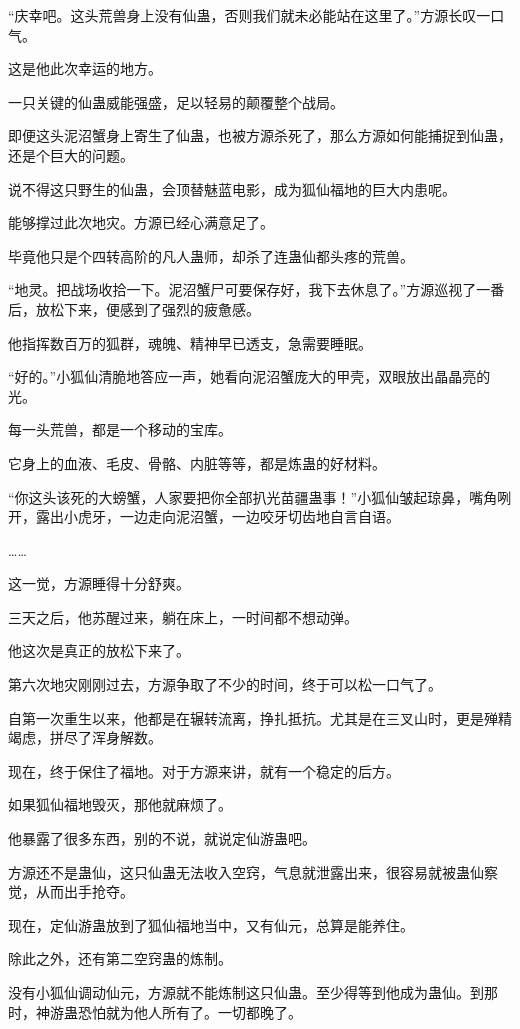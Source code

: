 \begin{this_body}
“庆幸吧。这头荒兽身上没有仙蛊，否则我们就未必能站在这里了。”方源长叹一口气。

这是他此次幸运的地方。

一只关键的仙蛊威能强盛，足以轻易的颠覆整个战局。

即便这头泥沼蟹身上寄生了仙蛊，也被方源杀死了，那么方源如何能捕捉到仙蛊，还是个巨大的问题。

说不得这只野生的仙蛊，会顶替魅蓝电影，成为狐仙福地的巨大内患呢。

能够撑过此次地灾。方源已经心满意足了。

毕竟他只是个四转高阶的凡人蛊师，却杀了连蛊仙都头疼的荒兽。

“地灵。把战场收拾一下。泥沼蟹尸可要保存好，我下去休息了。”方源巡视了一番后，放松下来，便感到了强烈的疲惫感。

他指挥数百万的狐群，魂魄、精神早已透支，急需要睡眠。

“好的。”小狐仙清脆地答应一声，她看向泥沼蟹庞大的甲壳，双眼放出晶晶亮的光。

每一头荒兽，都是一个移动的宝库。

它身上的血液、毛皮、骨骼、内脏等等，都是炼蛊的好材料。

“你这头该死的大螃蟹，人家要把你全部扒光苗疆蛊事！”小狐仙皱起琼鼻，嘴角咧开，露出小虎牙，一边走向泥沼蟹，一边咬牙切齿地自言自语。

……

这一觉，方源睡得十分舒爽。

三天之后，他苏醒过来，躺在床上，一时间都不想动弹。

他这次是真正的放松下来了。

第六次地灾刚刚过去，方源争取了不少的时间，终于可以松一口气了。

自第一次重生以来，他都是在辗转流离，挣扎抵抗。尤其是在三叉山时，更是殚精竭虑，拼尽了浑身解数。

现在，终于保住了福地。对于方源来讲，就有一个稳定的后方。

如果狐仙福地毁灭，那他就麻烦了。

他暴露了很多东西，别的不说，就说定仙游蛊吧。

方源还不是蛊仙，这只仙蛊无法收入空窍，气息就泄露出来，很容易就被蛊仙察觉，从而出手抢夺。

现在，定仙游蛊放到了狐仙福地当中，又有仙元，总算是能养住。

除此之外，还有第二空窍蛊的炼制。

没有小狐仙调动仙元，方源就不能炼制这只仙蛊。至少得等到他成为蛊仙。到那时，神游蛊恐怕就为他人所有了。一切都晚了。


\end{this_body}
